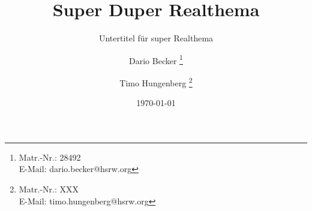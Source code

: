 \titlehead{
{\Large Hochschule Rhein Waal}\\
Fakultät für Kommunikation und Umwelt\\
Friedrich-Heinrich-Allee 25\\
47475 Kamp-Lintfort
}

\subject{
Abschlussbericht\\
\normalfont
im Modul Wissenschaftliches Arbeiten\\
}

\title{Super Duper Realthema}

\subtitle{Untertitel für super Realthema}
\author{
Dario Becker
\thanks{
 Matr.-Nr.: 28492\\
E-Mail: dario.becker@hsrw.org}
\and Timo Hungenberg
\thanks{
Matr.-Nr.: XXX\\
E-Mail: timo.hungenberg@hsrw.org}
}

\date{\today}


\maketitle
